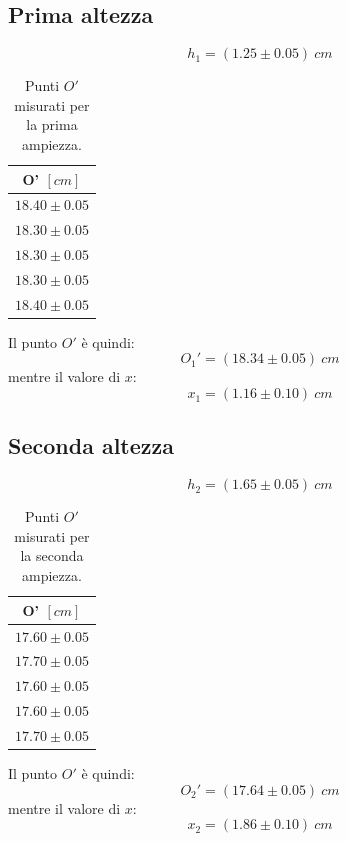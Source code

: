 \subsection{Prima altezza}
\begin{equation}
	h_1=(1.25\pm0.05)\ cm
\end{equation}

\begin{table}[H]
	\centering
	\begin{tabular}{|c|}
		\hline
		\textbf{O' $[cm]$} \\
		\hline
		$18.40\pm 0.05$ \\
		$18.30\pm 0.05$ \\
		$18.30\pm 0.05$ \\
		$18.30\pm 0.05$ \\
		$18.40\pm 0.05$ \\
		\hline
	\end{tabular}
	\caption{Punti $O'$ misurati per la prima ampiezza.}
	\label{tab:}
\end{table}

Il punto $O'$ è quindi:
\begin{equation}
	O_1'=(18.34\pm0.05)\ cm
\end{equation}
mentre il valore di $x$:
\begin{equation}
	x_1=(1.16\pm 0.10)\ cm
\end{equation}

\subsection{Seconda altezza}
\begin{equation}
	h_2=(1.65\pm0.05)\ cm
\end{equation}

\begin{table}[H]
	\centering
	\begin{tabular}{|c|}
		\hline
		\textbf{O' $[cm]$} \\
		\hline
		$17.60\pm 0.05$ \\
		$17.70\pm 0.05$ \\
		$17.60\pm 0.05$ \\
		$17.60\pm 0.05$ \\
		$17.70\pm 0.05$ \\
		\hline
	\end{tabular}
	\caption{Punti $O'$ misurati per la seconda ampiezza.}
	\label{tab:}
\end{table}

Il punto $O'$ è quindi:
\begin{equation}
	O_2'=(17.64\pm0.05)\ cm
\end{equation}
mentre il valore di $x$:
\begin{equation}
	x_2=(1.86\pm 0.10)\ cm
\end{equation}

